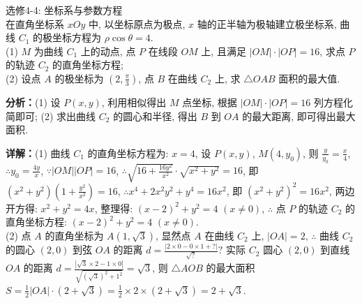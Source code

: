 \begin{question}[points=10]
选修4-4: 坐标系与参数方程 \\ 在直角坐标系 $xOy$ 中, 以坐标原点为极点, $x$ 轴的正半轴为极轴建立极坐标系, 曲线 $C_1$ 的极坐标方程为 $\rho\cos\theta=4$. \\ (1) $M$ 为曲线 $C_1$ 上的动点, 点 $P$ 在线段 $OM$ 上, 且满足 $|OM|\cdot|OP|=16$, 求点 $P$ 的轨迹 $C_2$ 的直角坐标方程; \\ (2) 设点 $A$ 的极坐标为 $\left(2,\frac{\pi}{3}\right)$, 点 $B$ 在曲线 $C_2$ 上, 求 $\triangle OAB$ 面积的最大值.
\begin{solution}

\textbf{分析：}(1) 设 $P(x,y)$, 利用相似得出 $M$ 点坐标, 根据 $|OM|\cdot|OP|=16$ 列方程化简即可; (2) 求出曲线 $C_2$ 的圆心和半径, 得出 $B$ 到 $OA$ 的最大距离, 即可得出最大面积.

\textbf{详解：}(1) 曲线 $C_1$ 的直角坐标方程为: $x=4$, 设 $P(x,y)$, $M(4,y_0)$, 则 $\frac{y}{y_0}=\frac{x}{4}$, $\therefore y_0=\frac{4y}{x}$, $\because |OM||OP|=16$, $\therefore \sqrt{16+\frac{16y^2}{x^2}}\cdot\sqrt{x^2+y^2}=16$, 即 $(x^2+y^2)\left(1+\frac{y^2}{x^2}\right)=16$, $\therefore x^4+2x^2y^2+y^4=16x^2$, 即 $(x^2+y^2)^2=16x^2$, 两边开方得: $x^2+y^2=4x$, 整理得: $(x-2)^2+y^2=4$ $(x\neq0)$, $\therefore$ 点 $P$ 的轨迹 $C_2$ 的直角坐标方程: $(x-2)^2+y^2=4$ $(x\neq0)$. \\ (2) 点 $A$ 的直角坐标为 $A(1,\sqrt{3})$, 显然点 $A$ 在曲线 $C_2$ 上, $|OA|=2$, $\therefore$ 曲线 $C_2$ 的圆心 $(2,0)$ 到弦 $OA$ 的距离 $d=\frac{|2\times0-0\times1+?|}{\sqrt{?}}?$ 实际 $C_2$ 圆心 $(2,0)$ 到直线 $OA$ 的距离 $d=\frac{|\sqrt{3}\times2-1\times0|}{\sqrt{(\sqrt{3})^2+1^2}}=\sqrt{3}$, 则 $\triangle AOB$ 的最大面积 $S=\frac{1}{2}|OA|\cdot(2+\sqrt{3})=\frac{1}{2}\times2\times(2+\sqrt{3})=2+\sqrt{3}$.
\end{solution}
\end{question}

